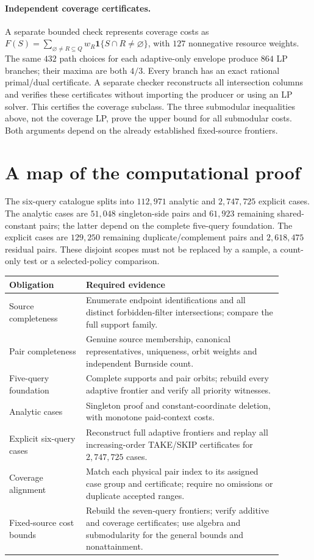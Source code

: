 \documentclass[pdflatex,sn-mathphys-num]{sn-jnl}
\theoremstyle{thmstyleone}
\theoremstyle{thmstylethree}
\theoremstyle{thmstyletwo}
\begin{document}
\paragraph*{Independent coverage certificates.}
A separate bounded check represents coverage costs as
$F(S)=\sum_{\varnothing\ne R\subseteq Q}w_R\mathbf1\{S\cap R\ne\varnothing\}$,
with $127$ nonnegative resource weights. The same $432$ path choices for each adaptive-only envelope produce $864$ LP branches; their maxima are both $4/3$. Every branch has an exact rational primal/dual certificate. A separate checker reconstructs all intersection columns and verifies these certificates without importing the producer or using an LP solver. This certifies the coverage subclass. The three submodular inequalities above, not the coverage LP, prove the upper bound for all submodular costs. Both arguments depend on the already established fixed-source frontiers.

\section{A map of the computational proof}\label{app:reproduction}
The six-query catalogue splits into $112,971$ analytic and $2,747,725$ explicit cases. The analytic cases are $51,048$ singleton-side pairs and $61,923$ remaining shared-constant pairs; the latter depend on the complete five-query foundation. The explicit cases are $129,250$ remaining duplicate/complement pairs and $2,618,475$ residual pairs. These disjoint scopes must not be replaced by a sample, a count-only test or a selected-policy comparison.

\begin{center}\small
\begin{tabular}{@{}p{0.25\linewidth}p{0.64\linewidth}@{}}\toprule
Obligation & Required evidence\\\midrule
Source completeness & Enumerate endpoint identifications and all distinct forbidden-filter intersections; compare the full support family.\\
Pair completeness & Genuine source membership, canonical representatives, uniqueness, orbit weights and independent Burnside count.\\
Five-query foundation & Complete supports and pair orbits; rebuild every adaptive frontier and verify all priority witnesses.\\
Analytic cases & Singleton proof and constant-coordinate deletion, with monotone paid-context costs.\\
Explicit six-query cases & Reconstruct full adaptive frontiers and replay all increasing-order TAKE/SKIP certificates for $2,747,725$ cases.\\
Coverage alignment & Match each physical pair index to its assigned case group and certificate; require no omissions or duplicate accepted ranges.\\
Fixed-source cost bounds & Rebuild the seven-query frontiers; verify additive and coverage certificates; use algebra and submodularity for the general bounds and nonattainment.\\\bottomrule
\end{tabular}
\end{center}
\end{document}
